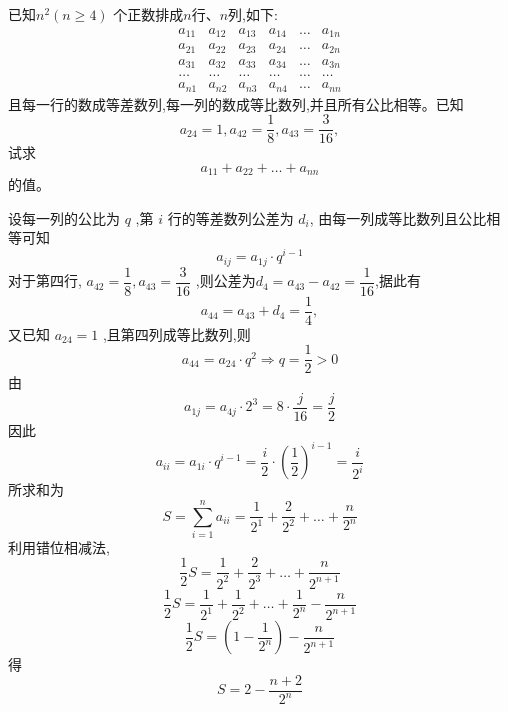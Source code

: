 \begin{questions}
    \question 已知$n^2 (n \ge 4)$ 个正数排成$n$行、$n$列,如下:
    \[ 
    \begin{matrix}
    a_{11} & a_{12} & a_{13} & a_{14} & \dots & a_{1n} \\
    a_{21} & a_{22} & a_{23} & a_{24} & \dots & a_{2n} \\
    a_{31} & a_{32} & a_{33} & a_{34} & \dots & a_{3n} \\
    \dots & \dots & \dots & \dots & \dots & \dots \\
    a_{n1} & a_{n2} & a_{n3} & a_{n4} & \dots & a_{nn}
    \end{matrix} 
    \]
    且每一行的数成等差数列,每一列的数成等比数列,并且所有公比相等。已知 
    \[
    a_{24} = 1, a_{42} = \frac{1}{8}, a_{43} = \frac{3}{16},
    \]
    试求 
    \[
    a_{11} + a_{22} + \dots + a_{nn}
    \]
    的值。
    \begin{solution}
        设每一列的公比为 $q$ ,第 $i$ 行的等差数列公差为 $d_i$,
        由每一列成等比数列且公比相等可知
        \[
        a_{ij} = a_{1j} \cdot q^{i-1}
        \]
        对于第四行, $a_{42} = \dfrac{1}{8},a_{43} = \dfrac{3}{16}$ ,则公差为$d_4 = a_{43} - a_{42} = \dfrac{1}{16}$,据此有 
        \[
        a_{44} = a_{43} + d_4 = \dfrac{1}{4},
        \]
        又已知 $a_{24} = 1$ ,且第四列成等比数列,则
        \[ 
        a_{44} = a_{24} \cdot q^2 \Rightarrow q = \frac{1}{2}>0
        \]
        由 
        \[
        a_{1j} = a_{4j} \cdot 2^3 = 8 \cdot \frac{j}{16} = \frac{j}{2}
        \]
        因此 
        \[
        a_{ii} = a_{1i} \cdot q^{i-1} = \frac{i}{2} \cdot \left( \frac{1}{2} \right)^{i-1} = \frac{i}{2^i}
        \]
        所求和为
        \[ 
        S = \sum_{i=1}^n a_{ii} = \frac{1}{2^1} + \frac{2}{2^2} + \dots + \frac{n}{2^n} 
        \]
        利用错位相减法,
        \[ 
        \frac{1}{2}S = \frac{1}{2^2} + \frac{2}{2^3} + \dots + \frac{n}{2^{n+1}} 
        \]
        \[ 
        \frac{1}{2}S = \frac{1}{2^1} + \frac{1}{2^2} + \dots + \frac{1}{2^n} - \frac{n}{2^{n+1}} 
        \]
        \[ 
        \frac{1}{2}S = (1 - \frac{1}{2^n}) - \frac{n}{2^{n+1}} 
        \]
        得
        \[ 
        S = 2 - \frac{n+2}{2^n} 
        \]
    \end{solution}


\end{questions}
